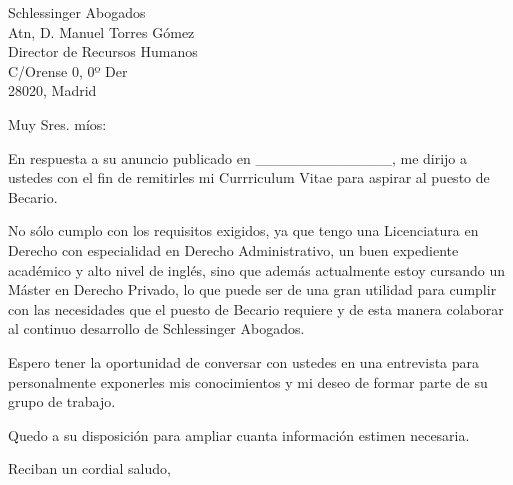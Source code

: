 \documentclass[10pt,a4paper]{letter}
\date{}
\begin{document}
\begin{letter}{Schlessinger Abogados \\
Atn, D. Manuel Torres Gómez \\
Director de Recursos Humanos \\
C/Orense 0, 0º Der \\
28020, Madrid}

\opening{Muy Sres. míos:} 
 
En respuesta a su anuncio publicado en \_\_\_\_\_\_\_\_\_\_\_\_\_, me dirijo a ustedes con el fin de remitirles mi Currriculum Vitae para aspirar al puesto de Becario.

No sólo cumplo con los requisitos exigidos, ya que tengo una  Licenciatura en Derecho con especialidad en Derecho Administrativo, un buen expediente académico y alto nivel de inglés, sino que además actualmente estoy  cursando un Máster en Derecho Privado, lo que puede ser de una gran utilidad para cumplir con  las necesidades que el puesto de Becario requiere y de esta manera colaborar al continuo desarrollo de Schlessinger Abogados.

Espero tener la oportunidad de conversar con ustedes en una entrevista para personalmente exponerles mis conocimientos y mi deseo de formar parte de su grupo de trabajo. 

Quedo a su disposición para ampliar cuanta información estimen necesaria.
 
\closing{Reciban un cordial saludo,}

\end{letter} 
\end{document}
